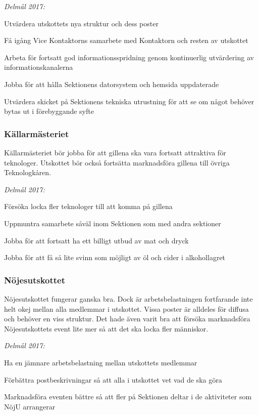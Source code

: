 \documentclass[../_main/handlingar.tex]{subfiles}
\begin{document}
\emph{Delmål 2017:}
\begin{dashlist}
    \item Utvärdera utskottets nya struktur och dess poster
    \item Få igång Vice Kontaktorns samarbete med Kontaktorn och resten av utskottet
    \item Arbeta för fortsatt god informationsspridning genom kontinuerlig utvärdering av informationskanalerna
    \item Jobba för att hålla Sektionens datorsystem och hemsida uppdaterade
    \item Utvärdera skicket på Sektionens tekniska utrustning för att se om något behöver bytas ut i förebyggande syfte
\end{dashlist}

\subsubsection*{Källarmästeriet}
Källarmästeriet bör jobba för att gillena ska vara fortsatt attraktiva för teknologer. Utskottet bör också fortsätta marknadsföra gillena till övriga Teknologkåren.

\emph{Delmål 2017:}
\begin{dashlist}
    \item Försöka locka fler teknologer till att komma på gillena
    \item Uppmuntra samarbete såväl inom Sektionen som med andra sektioner
    \item Jobba för att fortsatt ha ett billigt utbud av mat och dryck
    \item Jobba för att få så lite svinn som möjligt av öl och cider i alkohollagret
\end{dashlist}

\subsubsection*{Nöjesutskottet}
Nöjesutskottet fungerar ganska bra. Dock är arbetsbelastningen fortfarande inte helt okej mellan alla medlemmar i utskottet. Vissa poster är alldeles för diffusa och behöver en viss struktur. Det hade även varit bra att försöka marknadsföra Nöjesutskottets event lite mer så att det ska locka fler människor.

\emph{Delmål 2017:}
\begin{dashlist}
    \item Ha en jämnare arbetsbelastning mellan utskottets medlemmar
    \item Förbättra postbeskrivningar så att alla i utskottet vet vad de ska göra
    \item Marknadsföra eventen bättre så att fler på Sektionen deltar i de aktiviteter som NöjU arrangerar
\end{dashlist}
\end{document}
